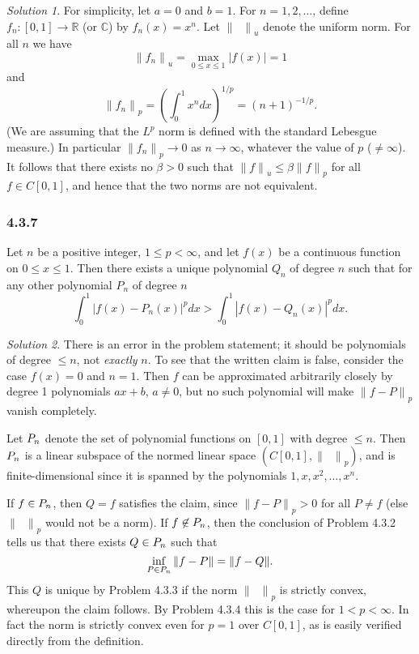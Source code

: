 \documentclass{report}
\newcommand{\bb}[1]{\mathbb{#1}}
\newcommand{\norm}[1]{{\lVert #1 \rVert}}
\let\sc\relax
\newcommand{\sc}[1]{\mathscr{#1}}
\theoremstyle{remark}
\newtheorem*{solution}{Solution}
\begin{document}
\begin{solution}
  For simplicity, let $a = 0$ and $b = 1$. For $n = 1,2,\dots$, define ${f_n: [0,1] \to \bb R}$ (or $\bb C$) by $f_n(x) = x^n$. Let $\norm{\phantom x}_u$ denote the uniform norm. For all $n$ we have
  \begin{equation*}
    \norm{f_n}_u = \max_{0 \le x \le 1} |f(x)| = 1
  \end{equation*}
  and
  \begin{equation*}
    \norm{f_n}_p = \left( \int_0^1 x^n dx \right)^{1/p} = (n+1)^{-1/p}.
  \end{equation*}
  (We are assuming that the $L^p$ norm is defined with the standard Lebesgue measure.) In particular $\norm{f_n}_p \to 0$ as $n \to \infty$, whatever the value of $p$ ($\ne \infty$). It follows that there exists no $\beta > 0$ such that $\norm{f}_u \le \beta \norm{f}_p$ for all $f \in C[0,1]$, and hence that the two norms are not equivalent.
\end{solution}

\subsubsection*{4.3.7}
Let $n$ be a positive integer, $1 \le p < \infty$, and let $f(x)$ be a continuous function on $0 \le x \le 1$. Then there exists a unique polynomial $Q_n$ of degree $n$ such that for any other polynomial $P_n$ of degree $n$
\begin{equation*}
  \int_0^1 |f(x) - P_n(x)|^p dx > \int_0^1 |f(x) - Q_n(x)|^p dx.
\end{equation*}

\begin{solution}
  There is an error in the problem statement; it should be polynomials of degree $\le n$, not \emph{exactly} $n$. To see that the written claim is false, consider the case $f(x) = 0$ and $n = 1$. Then $f$ can be approximated arbitrarily closely by degree 1 polynomials $ax + b$, $a \ne 0$, but no such polynomial will make $\norm{f - P}_p$ vanish completely.

  Let $\sc P_n$ denote the set of polynomial functions on $[0,1]$ with degree $\le n$. Then $\sc P_n$ is a linear subspace of the normed linear space $(C[0,1], \norm{\phantom x}_p)$, and is finite-dimensional since it is spanned by the polynomials $1, x, x^2, \dots, x^n$.

  If $f \in \sc P_n$, then $Q = f$ satisfies the claim, since $\norm{f - P}_p > 0$ for all $P \ne f$ (else $\norm{\phantom x}_p$ would not be a norm). If $f \not\in \sc P_n$, then the conclusion of Problem 4.3.2 tells us that there exists $Q \in \sc P_n$ such that
  \begin{equation*}
    \inf_{P \in \sc P_n} \norm{f - P} = \norm{f - Q}.
  \end{equation*}
  This $Q$ is unique by Problem 4.3.3 if the norm $\norm{\phantom x}_p$ is strictly convex, whereupon the claim follows. By Problem 4.3.4 this is the case for $1 < p < \infty$. In fact the norm is strictly convex even for $p = 1$ over $C[0,1]$, as is easily verified directly from the definition.
\end{solution}
\end{document}
